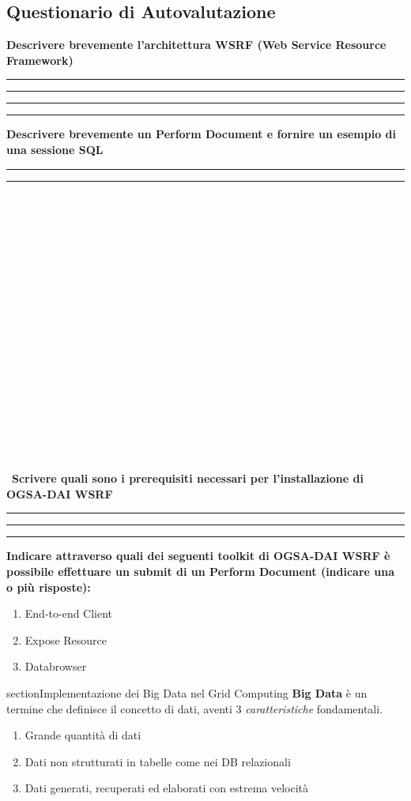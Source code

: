 \documentclass[11pt]{article}
\newcommand{\voceU}[1]{%
	\item #1\dotfill\Square%
}
\begin{document}
\subsection{Questionario di Autovalutazione}
\textbf{Descrivere brevemente l'architettura WSRF (Web Service Resource Framework)}\\[5ex]
\rule[5mm]{\textwidth}{0.1mm} 
\rule[5mm]{\textwidth}{0.1mm} 
\rule[5mm]{\textwidth}{0.1mm} 
\rule[5mm]{\textwidth}{0.1mm} 
\textbf{Descrivere brevemente un Perform Document e fornire un esempio di una sessione SQL}\\[5ex]
\rule[5mm]{\textwidth}{0.1mm} 
\rule[5mm]{\textwidth}{0.1mm} \\\\\\\\\\\\\\\\\\\\\\\\\\\\\\\\\\\\\
\textbf{Scrivere quali sono i prerequisiti necessari per l'installazione di OGSA-DAI WSRF}\\[5ex]
\rule[5mm]{\textwidth}{0.1mm} 
\rule[5mm]{\textwidth}{0.1mm} 
\rule[5mm]{\textwidth}{0.1mm} 
\textbf{Indicare attraverso quali dei seguenti toolkit di OGSA-DAI WSRF è possibile effettuare un submit di un Perform Document (indicare una o più risposte): }
\begin{enumerate}
	\voceU{End-to-end Client}
	\voceU{Expose Resource}
	\voceU{Databrowser}\\
\end{enumerate}
\newpage


section{Implementazione dei Big Data nel Grid Computing}
\textbf{Big Data} è un termine che definisce il concetto di dati, aventi 3 \emph{caratteristiche} fondamentali. 
\begin{enumerate}
	\item Grande quantità di dati
	\item Dati non strutturati in tabelle come nei DB relazionali
	\item Dati generati, recuperati ed elaborati con estrema velocità
\end{enumerate}
\end{document}
